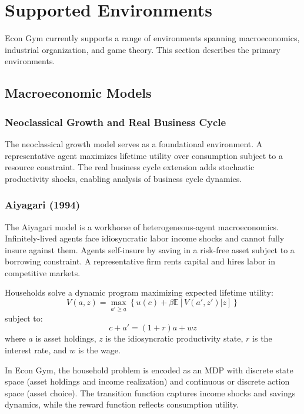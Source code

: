 \documentclass[12pt]{article}
\begin{document}
\section{Supported Environments} \label{sec:environments}

Econ Gym currently supports a range of environments spanning macroeconomics, industrial organization, and game theory. This section describes the primary environments.

\subsection{Macroeconomic Models}

\subsubsection{Neoclassical Growth and Real Business Cycle}

The neoclassical growth model serves as a foundational environment. A representative agent maximizes lifetime utility over consumption subject to a resource constraint. The real business cycle extension adds stochastic productivity shocks, enabling analysis of business cycle dynamics.

\subsubsection{Aiyagari (1994)}

The Aiyagari model is a workhorse of heterogeneous-agent macroeconomics. Infinitely-lived agents face idiosyncratic labor income shocks and cannot fully insure against them. Agents self-insure by saving in a risk-free asset subject to a borrowing constraint. A representative firm rents capital and hires labor in competitive markets.

Households solve a dynamic program maximizing expected lifetime utility:
\begin{equation}
    V(a, z) = \max_{a' \geq \underline{a}} \left\{ u(c) + \beta \mathbb{E}[V(a', z') | z] \right\}
\end{equation}
subject to:
\begin{equation}
    c + a' = (1 + r)a + wz
\end{equation}
where $a$ is asset holdings, $z$ is the idiosyncratic productivity state, $r$ is the interest rate, and $w$ is the wage.

In Econ Gym, the household problem is encoded as an MDP with discrete state space (asset holdings and income realization) and continuous or discrete action space (asset choice). The transition function captures income shocks and savings dynamics, while the reward function reflects consumption utility.
\end{document}
